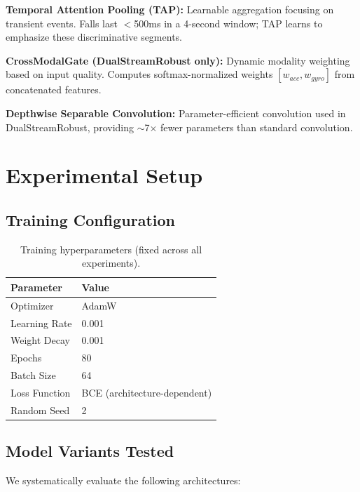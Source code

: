 \documentclass{article}
\begin{document}
\textbf{Temporal Attention Pooling (TAP):} Learnable aggregation focusing on transient events. Falls last $<$500ms in a 4-second window; TAP learns to emphasize these discriminative segments.

\textbf{CrossModalGate (DualStreamRobust only):} Dynamic modality weighting based on input quality. Computes softmax-normalized weights $[w_{acc}, w_{gyro}]$ from concatenated features.

\textbf{Depthwise Separable Convolution:} Parameter-efficient convolution used in DualStreamRobust, providing $\sim$7$\times$ fewer parameters than standard convolution.

\section{Experimental Setup}

\subsection{Training Configuration}

\begin{table}[htbp]
    \centering
    \caption{Training hyperparameters (fixed across all experiments).}
    \label{tab:training}
    \begin{tabular}{ll}
        \toprule
        \textbf{Parameter} & \textbf{Value} \\
        \midrule
        Optimizer & AdamW \\
        Learning Rate & 0.001 \\
        Weight Decay & 0.001 \\
        Epochs & 80 \\
        Batch Size & 64 \\
        Loss Function & BCE (architecture-dependent) \\
        Random Seed & 2 \\
        \bottomrule
    \end{tabular}
\end{table}

\subsection{Model Variants Tested}

We systematically evaluate the following architectures:
\end{document}
